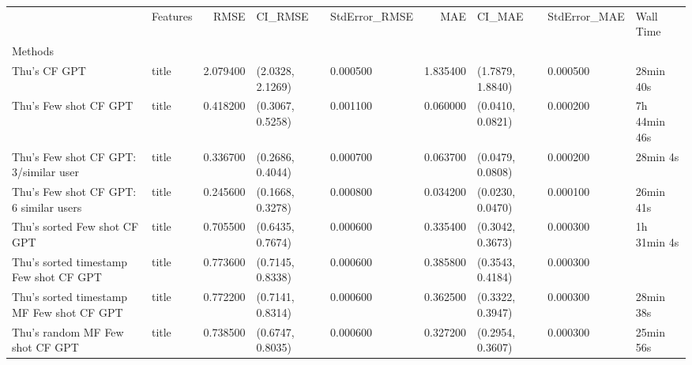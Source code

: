 \begin{tabular}{llrllrlll}
 & Features & RMSE & CI_RMSE & StdError_RMSE & MAE & CI_MAE & StdError_MAE & Wall Time \\
Methods &  &  &  &  &  &  &  &  \\
Thu's CF GPT & title & 2.079400 & (2.0328, 2.1269) & 0.000500 & 1.835400 & (1.7879, 1.8840) & 0.000500 & 28min 40s \\
Thu's Few shot CF GPT & title & 0.418200 & (0.3067, 0.5258) & 0.001100 & 0.060000 & (0.0410, 0.0821) & 0.000200 & 7h 44min 46s \\
Thu's Few shot CF GPT: 3/similar user & title & 0.336700 & (0.2686, 0.4044) & 0.000700 & 0.063700 & (0.0479, 0.0808) & 0.000200 & 28min 4s \\
Thu's Few shot CF GPT: 6 similar users & title & 0.245600 & (0.1668, 0.3278) & 0.000800 & 0.034200 & (0.0230, 0.0470) & 0.000100 & 26min 41s \\
Thu's sorted Few shot CF GPT & title & 0.705500 & (0.6435, 0.7674) & 0.000600 & 0.335400 & (0.3042, 0.3673) & 0.000300 & 1h 31min 4s \\
Thu's sorted timestamp Few shot CF GPT & title & 0.773600 & (0.7145, 0.8338) & 0.000600 & 0.385800 & (0.3543, 0.4184) & 0.000300 &  \\
Thu's sorted timestamp MF Few shot CF GPT & title & 0.772200 & (0.7141, 0.8314) & 0.000600 & 0.362500 & (0.3322, 0.3947) & 0.000300 & 28min 38s \\
Thu's random MF Few shot CF GPT & title & 0.738500 & (0.6747, 0.8035) & 0.000600 & 0.327200 & (0.2954, 0.3607) & 0.000300 & 25min 56s \\
\end{tabular}
